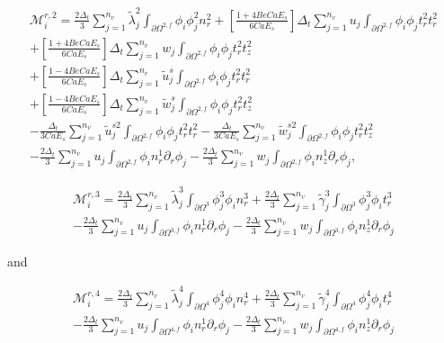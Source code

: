 \documentclass{article}
\begin{document}
\begin{equation}
\begin{array}{l} \mathcal{M}_i^{r,2} = \frac{2\Delta_t}{3} \sum_{j=1}^{n_v} \tilde{\lambda}_j^2 \int_{\partial \Omega^{2,f}} \phi_i \phi_j^2 n_r^2 + \left[ \frac{1 + 4Be Ca E_s}{6Ca E_s} \right] \Delta_t \sum_{j=1}^{n_v} u_j \int_{\partial \Omega^{2,f}} \phi_i \phi_j t_r^2 t_r^2 \\ + \left[ \frac{1 + 4Be Ca E_s}{6Ca E_s} \right] \Delta_t \sum_{j=1}^{n_v} w_j \int_{\partial \Omega^{2,f}} \phi_i \phi_j t_r^2 t_z^2 \\ + \left[ \frac{1 - 4Be Ca E_s}{6Ca E_s} \right] \Delta_t \sum_{j=1}^{n_v} \tilde{u}_j^s \int_{\partial \Omega^{2,f}} \phi_i \phi_j t_r^2 t_r^2 \\ + \left[ \frac{1 - 4Be Ca E_s}{6Ca E_s} \right] \Delta_t \sum_{j=1}^{n_v} \tilde{w}_j^s \int_{\partial \Omega^{2,f}} \phi_i \phi_j t_r^2 t_z^2 \\ - \frac{\Delta_t}{3Ca E_s} \sum_{j=1}^{n_v} \tilde{u}_j^{s2} \int_{\partial \Omega^{2,f}} \phi_i \phi_j t_r^2 t_r^2 - \frac{\Delta_t}{3Ca E_s} \sum_{j=1}^{n_v} \tilde{w}_j^{s2} \int_{\partial \Omega^{2,f}} \phi_i \phi_j t_r^2 t_z^2 \\ - \frac{2\Delta_t}{3} \sum_{j=1}^{n_v} u_j \int_{\partial \Omega^{2,f}} \phi_i n_r^1 \partial_r \phi_j - \frac{2\Delta_t}{3} \sum_{j=1}^{n_v} w_j \int_{\partial \Omega^{2,f}} \phi_i n_z^1 \partial_r \phi_j, \end{array} \tag{4.94}
\end{equation}

\begin{equation}
\begin{array}{l} \mathcal{M}_i^{r,3} = \frac{2\Delta_t}{3} \sum_{j=1}^{n_v} \tilde{\lambda}_j^3 \int_{\partial \Omega^{3}} \phi_j^3 \phi_i n_r^3 + \frac{2\Delta_t}{3} \sum_{j=1}^{n_v} \tilde{\gamma}_j^3 \int_{\partial \Omega^{3}} \phi_j^3 \phi_i t_r^3 \\ - \frac{2\Delta_t}{3} \sum_{j=1}^{n_v} u_j \int_{\partial \Omega^{3,f}} \phi_i n_r^1 \partial_r \phi_j - \frac{2\Delta_t}{3} \sum_{j=1}^{n_v} w_j \int_{\partial \Omega^{3,f}} \phi_i n_z^1 \partial_r \phi_j \end{array} \tag{4.95}
\end{equation}

and

\begin{equation}
\begin{array}{l} \mathcal{M}_i^{r,4} = \frac{2\Delta_t}{3} \sum_{j=1}^{n_v} \tilde{\lambda}_j^4 \int_{\partial \Omega^{4}} \phi_j^4 \phi_i n_r^4 + \frac{2\Delta_t}{3} \sum_{j=1}^{n_v} \tilde{\gamma}_j^4 \int_{\partial \Omega^{4}} \phi_j^4 \phi_i t_r^4 \\ - \frac{2\Delta_t}{3} \sum_{j=1}^{n_v} u_j \int_{\partial \Omega^{4,f}} \phi_i n_r^1 \partial_r \phi_j - \frac{2\Delta_t}{3} \sum_{j=1}^{n_v} w_j \int_{\partial \Omega^{4,f}} \phi_i n_z^1 \partial_r \phi_j \end{array} \tag{4.96}
\end{equation}
\end{document}
